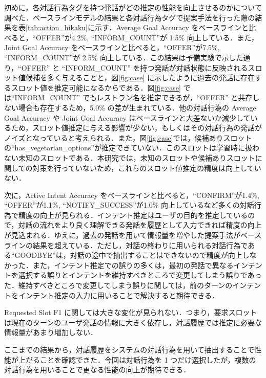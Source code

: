 初めに，各対話行為タグを持つ発話がどの推定の性能を向上させるのかについて調べた．ベースラインモデルの結果と各対話行為タグで提案手法を行った際の結果を表\ref{tab:action_hikaku}に示す．Average Goal Accuracy をベースラインと比べると，“OFFER”が4.2\%, “INFORM\_COUNT”が 1.5\% 向上している．また，Joint Goal Accuracy をベースラインと比べると，“OFFER”が7.5\%, “INFORM\_COUNT”が 2.5\% 向上している．この結果は予備実験で示した通り，“OFFER” と “INFORM\_COUNT” を持つ発話が対話状態に反映されるスロット値候補を多く与えることと，図\ref{fig:case} に示したように過去の発話に存在するスロット値を推定可能になるからである．図\ref{fig:case} では“INFORM\_COUNT” でもレストラン名を推定できるが，“OFFER” と共存しない場合も存在するため，5.0\% の差が生まれている．他の対話行為の Average Goal Accuracy や Joint Goal Accuracy はベースラインと大差ないか減少しているため，スロット値推定に与える影響が少ない，もしくはその対話行為の発話がノイズとなっていると考えられる．また，図\ref{fig:case}では，候補ありスロットの“has\_vegetarian\_options”が推定できていない．このスロットは学習時に扱わない未知のスロットである．本研究では，未知のスロットや候補ありスロットに関しての対策を行っていないため，これらのスロット値推定の精度は向上していない．
\par

次に，Active Intent Accuracy をベースラインと比べると，“CONFIRM”が1.4\%, “OFFER”が1.1\%, “NOTIFY\_SUCCESS”が1.0\% 向上しているなど多くの対話行為で精度の向上が見られる．インテント推定はユーザの目的を推定しているので，対話の流れをより良く理解できる発話を履歴として入力できれば精度の向上が見込まれる．ゆえに，過去の発話を用いて情報量を増やした提案手法がベースラインの結果を超えている．ただし，対話の終わりに用いられる対話行為である“GOODBYE”は，対話の途中で抽出することはできないので精度が向上しなかった．また，インテント推定での誤りの多くは，最初の発話で異なるインテントを選択する誤りとインテントを維持すべきところで変更してしまう誤りであった．維持すべきところで変更してしまう誤りに関しては，前のターンのインテントをインテント推定の入力に用いることで解決すると期待できる．
\par
Requested Slot F1 に関しては大きな変化が見られない．つまり，要求スロットは現在のターンのユーザ発話の情報に大きく依存し，対話履歴では推定に必要な情報量があまり増加しない．
\par
ここまでの結果から，対話履歴をシステムの対話行為を用いて抽出することで性能が上がることを確認できた．今回は対話行為を 1 つだけ選択したが，複数の対話行為を用いることで更なる性能の向上が期待できる．

